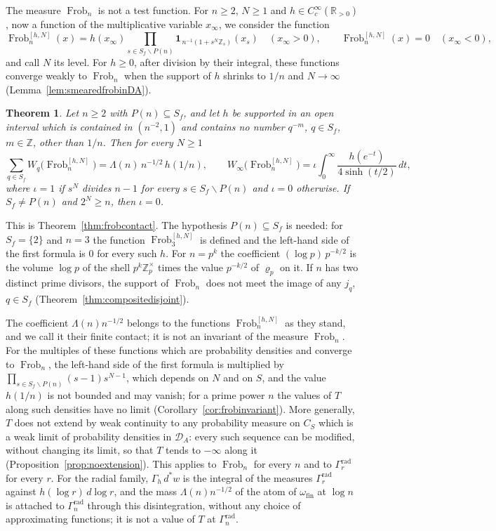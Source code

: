 \documentclass[11pt]{amsart}
\newtheorem{theorem}{Theorem}[section]
\theoremstyle{definition}
\newcommand{\R}{\mathbb R}
\newcommand{\Z}{\mathbb Z}
\newcommand{\Frob}{\operatorname{Frob}}
\newcommand{\DA}{\mathcal D_A}
\begin{document}
The measure $\Frob_n$ is not a test function. For $n\ge2$, $N\ge1$ and
$h\in C_c^\infty(\R_{>0})$, now a function of the multiplicative variable
$x_\infty$, we consider the function
\[
  \Frob_n^{[h,N]}(x)=h(x_\infty)\prod_{s\in S_f\smallsetminus P(n)}
   \mathbf 1_{\,n^{-1}(1+s^N\Z_s)}(x_s)\quad(x_\infty>0),\qquad
  \Frob_n^{[h,N]}(x)=0\quad(x_\infty<0),
\]
and call $N$ its level. For $h\ge0$, after division by their integral, these
functions converge weakly to $\Frob_n$ when the support of $h$ shrinks to
$1/n$ and $N\to\infty$ (Lemma~\ref{lem:smearedfrobinDA}).

\begin{theorem}\label{thm:introB}
Let $n\ge2$ with $P(n)\subseteq S_f$, and let $h$ be supported in an open
interval which is contained in $(n^{-2},1)$ and contains no number $q^{-m}$,
$q\in S_f$, $m\in\Z$, other than $1/n$. Then for every $N\ge1$
\[
  \sum_{q\in S_f}W_q\bigl(\Frob_n^{[h,N]}\bigr)
   =\Lambda(n)\,n^{-1/2}\,h(1/n),
  \qquad
  W_\infty\bigl(\Frob_n^{[h,N]}\bigr)
   =\iota\int_0^\infty\frac{h(e^{-t})}{4\sinh(t/2)}\,dt ,
\]
where $\iota=1$ if $s^N$ divides $n-1$ for every $s\in S_f\smallsetminus P(n)$
and $\iota=0$ otherwise. If $S_f\ne P(n)$ and $2^N\ge n$, then $\iota=0$.
\end{theorem}

This is Theorem~\ref{thm:frobcontact}. The hypothesis $P(n)\subseteq S_f$ is
needed: for $S_f=\{2\}$ and $n=3$ the function $\Frob_3^{[h,N]}$ is defined
and the left-hand side of the first formula is $0$ for every such $h$. For
$n=p^k$ the coefficient $(\log p)\,p^{-k/2}$ is the volume $\log p$ of the
shell $p^k\Z_p^\times$ times the value $p^{-k/2}$ of $\varrho_p$ on it. If
$n$ has two distinct prime divisors, the support of $\Frob_n$ does not meet
the image of any $j_q$, $q\in S_f$ (Theorem~\ref{thm:compositedisjoint}).

The coefficient $\Lambda(n)n^{-1/2}$ belongs to the functions
$\Frob_n^{[h,N]}$ as they stand, and we call it their finite contact; it is
not an invariant of the measure $\Frob_n$. For the multiples of these
functions which are probability densities and converge to $\Frob_n$, the
left-hand side of the first formula is multiplied by
$\prod_{s\in S_f\smallsetminus P(n)}(s-1)s^{N-1}$, which depends on $N$ and
on $S$, and the value $h(1/n)$ is not bounded and may vanish; for a prime
power $n$ the values of $T$ along such densities have no limit
(Corollary~\ref{cor:frobinvariant}). More generally, $T$ does not extend by
weak continuity to any probability measure on $C_S$ which is a weak limit of
probability densities in $\DA$: every such sequence can be modified,
without changing its limit, so that $T$ tends to $-\infty$ along it
(Proposition~\ref{prop:noextension}). This applies to $\Frob_n$ for every
$n$ and to $\Gamma_r^{\mathrm{rad}}$ for every $r$. For the radial family,
$\Gamma_h\,d^*w$ is the integral of the measures
$\Gamma_r^{\mathrm{rad}}$ against $h(\log r)\,d\log r$, and the mass
$\Lambda(n)n^{-1/2}$ of the atom of $\omega_{\mathrm{fin}}$ at $\log n$ is
attached to $\Gamma_n^{\mathrm{rad}}$ through this disintegration, without
any choice of approximating functions; it is not a value of $T$ at
$\Gamma_n^{\mathrm{rad}}$.
\end{document}
